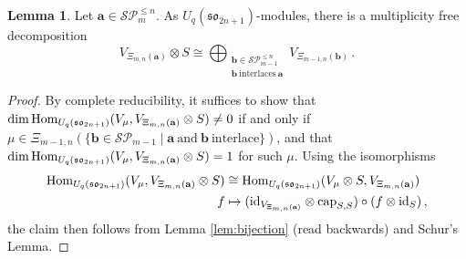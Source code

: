 \documentclass[10pt]{amsart}
\numberwithin{equation}{section}
\theoremstyle{definition}
\newtheorem{lem}[thm]{Lemma}
\newcommand{\Hom}{{\rm Hom}}
\newcommand{\id}{{\rm id}}
\newcommand{\son}[1][2n+1]{\mathfrak{so}_{#1}}
\newcommand{\ab}{\mathbf{a}}
\newcommand{\abb}{\mathbf{b}}
\newcommand{\SP}{\mathcal{SP}}
\begin{document}
\begin{lem}\label{lem:bijectionbackwards}
Let $\ab\in \SP_m^{\le n}$. 
As $U_q(\son)$-modules,
there is a multiplicity free decomposition
\begin{equation}\label{eq:bijectionbackwards}
V_{\Xi_{m,n}(\ab)}\otimes S \cong 
\bigoplus_{\substack{ \abb\in \SP_{m-1}^{\le n} \\\abb \ \text{interlaces} \ \ab}} V_{\Xi_{m-1,n}(\abb)} \, .
\end{equation}
\end{lem}
\begin{proof}
By complete reducibility, it suffices to show that
$\dim\Hom_{U_q(\son)}(V_{\mu}, V_{\Xi_{m,n}(\ab)}\otimes S) \ne 0$ 
if and only if
$\mu \in \Xi_{m-1, n}\left( \{\abb\in \SP_{m-1} \mid  \ab \ \text{and} \ \abb \ \text{interlace}\}\right)$,
and that $\dim\Hom_{U_q(\son)}(V_{\mu}, V_{\Xi_{m,n}(\ab)}\otimes S) =1$ for such $\mu$. 
Using the isomorphisms
\begin{align*}
\Hom_{U_q(\son)}(V_{\mu}, V_{\Xi_{m,n}(\ab)}\otimes S) &\cong \Hom_{U_q(\son)}(V_{\mu}\otimes S, V_{\Xi_{m,n}(\ab)}) \\
 f&\mapsto (\id_{V_{\Xi_{m,n}(\ab)}}\otimes \mathrm{cap}_{S,S})\circ (f\otimes \mathrm{id}_S) \, ,
\end{align*}
the claim then follows from Lemma \ref{lem:bijection} (read backwards) and Schur's Lemma.
\end{proof}
\end{document}
